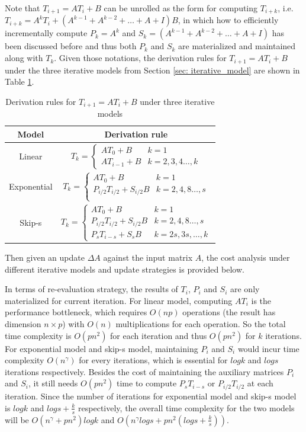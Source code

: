 Note that $T_{i+1} = AT_{i} + B$ can be unrolled as the form for computing $T_{i+k}$, i.e. $T_{i+k} = A^kT_{i} + (A^{k-1} + A^{k-2} + \dots + A + I) B$, in which how to efficiently incrementally compute $P_k = A^k$ and $S_k = (A^{k-1} + A^{k-2} + \dots + A + I)$ has been discussed before and thus both $P_k$ and $S_k$ are materialized and maintained along with $T_k$. Given those notations, the derivation rules for $T_{i+1} = AT_{i} + B$ under the three iterative models from Section \ref{sec: iterative_model} are shown in Table \ref{tab:derivation_rule}.

\begin{table}[]
    \centering
    \begin{tabular}{|c|c|}\hline
        Model & Derivation rule \\ \hline
        Linear & $T_k=
\begin{cases}
AT_0 + B& k=1\\
AT_{i-1} + B & k=2,3,4\dots,k
\end{cases}$\\ \hline
        Exponential & $T_k=
\begin{cases}
AT_0 + B& k=1\\
P_{i/2}T_{i/2} + S_{i/2}B & k=2,4,8\dots,s\\
\end{cases}$\\ \hline
        Skip-s &$T_k=
\begin{cases}
AT_0 + B& k=1\\
P_{i/2}T_{i/2} + S_{i/2}B & k=2,4,8\dots,s\\
P_sT_{i-s} + S_sB & k = 2s, 3s, \dots, k
\end{cases}$\\ \hline
    \end{tabular}
    \caption{Derivation rules for $T_{i+1} = AT_{i} + B$ under three iterative models}
    \label{tab:derivation_rule}
\end{table}

Then given an update $\Delta A$ against the input matrix $A$, the cost analysis under different iterative models and update strategies is provided below.

In terms of re-evaluation strategy, the results of $T_i$, $P_i$ and $S_i$ are only materialized for current iteration. For linear model, computing $AT_i$ is the performance bottleneck, which requires $O(np)$ operations (the result has dimension $n \times p$) with $O(n)$ multiplications for each operation. So the total time complexity is $O(pn^2)$ for each iteration and thus $O(pn^2)$ for $k$ iterations. For exponential model and skip-s model, maintaining $P_i$ and $S_i$ would incur time complexity $O(n^{\gamma})$ for every iterations, which is essential for $logk$ and $logs$ iterations respectively. Besides the cost of maintaining the auxiliary matrices $P_i$ and $S_i$, it still needs $O(pn^2)$ time to compute $P_sT_{i-s}$ or $P_{i/2}T_{i/2}$ at each iteration. Since the number of iterations for exponential model and skip-s model is $logk$ and $logs + \frac{k}{s}$ respectively, the overall time complexity for the two models will be $O(n^{\gamma} + pn^2)logk$ and $O(n^{\gamma}logs + pn^2(logs+ \frac{k}{s}))$.

